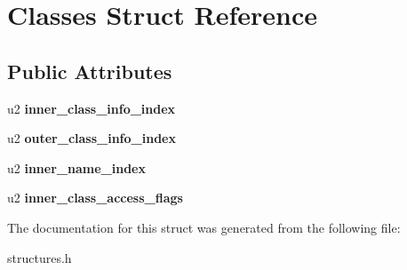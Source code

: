 \hypertarget{structClasses}{}\section{Classes Struct Reference}
\label{structClasses}
\subsection*{Public Attributes}
\begin{DoxyCompactItemize}
\item 
u2 {\bfseries inner\+\_\+class\+\_\+info\+\_\+index}\hypertarget{structClasses_a81deba58ea3d27176396999857216eba}{}\label{structClasses_a81deba58ea3d27176396999857216eba}

\item 
u2 {\bfseries outer\+\_\+class\+\_\+info\+\_\+index}\hypertarget{structClasses_a7437bc55eb998ea0d4eec7b8ebda32c5}{}\label{structClasses_a7437bc55eb998ea0d4eec7b8ebda32c5}

\item 
u2 {\bfseries inner\+\_\+name\+\_\+index}\hypertarget{structClasses_ae675c3ce50aa5f7714c632aef5b004b9}{}\label{structClasses_ae675c3ce50aa5f7714c632aef5b004b9}

\item 
u2 {\bfseries inner\+\_\+class\+\_\+access\+\_\+flags}\hypertarget{structClasses_ad90d20687902aa92ca1c6fa8f03b0302}{}\label{structClasses_ad90d20687902aa92ca1c6fa8f03b0302}

\end{DoxyCompactItemize}


The documentation for this struct was generated from the following file\+:\begin{DoxyCompactItemize}
\item 
structures.\+h\end{DoxyCompactItemize}

